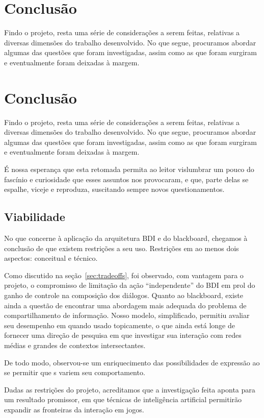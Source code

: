 \chapter{Conclusão}


Findo o projeto, resta uma série de considerações a serem feitas,
relativas a diversas dimensões do trabalho desenvolvido. No que
segue, procuramos abordar algumas das questões que foram investigadas,
assim como as que foram surgiram e eventualmente foram deixadas à
margem.
\chapter{Conclusão}

Findo o projeto, resta uma série de considerações a serem feitas,
relativas a diversas dimensões do trabalho desenvolvido. No que
segue, procuramos abordar algumas das questões que foram investigadas,
assim como as que foram surgiram e eventualmente foram deixadas à
margem.


É nossa esperança que esta retomada permita ao leitor vislumbrar um
pouco do fascínio e curiosidade que esses assuntos nos provocaram, e
que, parte delas se espalhe, viceje e reproduza, suscitando sempre
novos questionamentos.

\section{Viabilidade}

No que concerne à aplicação da arquitetura BDI e do blackboard,
chegamos à conclusão de que existem restrições a seu uso. Restrições
em ao menos dois aspectos: conceitual e técnico.

Como discutido na seção~\ref{sec:tradeoffs}, foi observado, com
vantagem para o projeto, o compromisso de limitação da ação
``independente'' do BDI em prol do ganho de controle na composição dos
diálogos. Quanto ao blackboard, existe ainda a questão de encontrar
uma abordagem mais adequada do problema de compartilhamento de
informação. Nosso modelo, simplificado, permitiu avaliar seu
desempenho em quando usado topicamente, o que ainda está longe de
fornecer uma direção de pesquisa em que investigar sua interação com
redes médias e grandes de contextos intersectantes.

De todo modo, observou-se um enriquecimento das possibilidades de
expressão ao se permitir que \npc{}s variem seu comportamento.

Dadas as restrições do projeto, acreditamos que a investigação feita aponta para um resultado promissor, em que técnicas de inteligência artificial permitirão expandir as fronteiras da interação em jogos.

